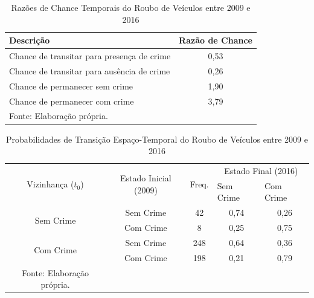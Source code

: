 \documentclass[12pt,openright,oneside,a4paper,english,french,spanish]{abntex2}
\numberwithin{table}{section} %
\numberwithin{figure}{section} %
\begin{document}
\begin{subappendices}
\begin{table}[H]
\centering
\caption{Razões de Chance Temporais do Roubo de Veículos entre 2009 e 2016}
        \begin{tabular}{lc}
            \hline
            {\textbf{Descrição}} & {\textbf{Razão de Chance}} \\\hline
            {Chance de transitar para presença de crime} & {0,53} \\
            {Chance de transitar para ausência de crime} & {0,26} \\
            {Chance de permanecer sem crime} & {1,90} \\
            {Chance de permanecer com crime} & {3,79} \\\hline
            \tiny Fonte: Elaboração própria.
        \end{tabular}
    \label{tab:odds_tempo_roub_vei_2009_2016}
\end{table}


\begin{table}[H]
\centering
\caption{Probabilidades de Transição Espaço-Temporal do Roubo de Veículos entre 2009 e 2016}
        \begin{tabular}{ccccc}
            \hline
            \multirow{2}{*}{Vizinhança ($t_0$)} & \multirow{2}{*}{Estado Inicial (2009)} & \multirow{2}{*}{Freq.} & \multicolumn{2}{c}{Estado Final (2016)}  \\\cline{4-5} %
                                        & & & \multicolumn{1}{l}{Sem Crime} & \multicolumn{1}{l}{Com Crime} \\\hline
            \multirow{2}{*}{Sem Crime} & {Sem Crime} & 42 &  {0,74} & {0,26} \\
                                       & {Com Crime} & 8 &   {0,25} & {0,75} \\\hline
            \multirow{2}{*}{Com Crime} & {Sem Crime} & 248 & {0,64} & {0,36} \\
                                       & {Com Crime} & 198 & {0,21} & {0,79} \\\hline
            \tiny Fonte: Elaboração própria.
        \end{tabular}
    \label{tab:prob_espaco_tempo_roub_vei_2009_2016}
\end{table}



\end{subappendices}
\end{document}
